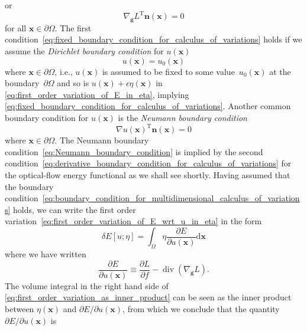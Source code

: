 \documentclass[12pt,a4paper]{article}
\begin{document}
or 
\begin{equation}
{\nabla_{\mathbf{g}} L}^{\operatorname{T}} \mathbf{n}(\mathbf{x}) = 0
\label{eq:derivative_boundary_condition_for_calculus_of_variations}
\end{equation}
for all $\mathbf{x} \in \partial\Omega$.
The first condition~\eqref{eq:fixed_boundary_condition_for_calculus_of_variations} holds
if we assume the \emph{Dirichlet boundary condition} for $u(\mathbf{x})$
\begin{equation}
u(\mathbf{x}) = u_0(\mathbf{x})
\label{eq:Dirichlet_boundary_condition}
\end{equation}
where $\mathbf{x} \in \partial\Omega$, i.e.,
$u(\mathbf{x})$ is assumed to be fixed to some value~$u_0(\mathbf{x})$
at the boundary~$\partial\Omega$ and
so is $u(\mathbf{x}) + \epsilon\eta(\mathbf{x})$ in
\eqref{eq:first_order_variation_of_E_in_eta},
implying \eqref{eq:fixed_boundary_condition_for_calculus_of_variations}.
Another common boundary condition for $u(\mathbf{x})$ is the \emph{Neumann boundary condition}
\begin{equation}
{\nabla u(\mathbf{x})}^{\operatorname{T}} \mathbf{n}(\mathbf{x}) = 0
\label{eq:Neumann_boundary_condition}
\end{equation}
where $\mathbf{x} \in \partial\Omega$.
The Neumann boundary condition~\eqref{eq:Neumann_boundary_condition} is implied by
the second condition~\eqref{eq:derivative_boundary_condition_for_calculus_of_variations}
for the optical-flow energy functional as we shall see shortly.
Having assumed that
the boundary condition~\eqref{eq:boundary_condition_for_multidimensional_calculus_of_variations}
holds, we can write the first order variation~\eqref{eq:first_order_variation_of_E_wrt_u_in_eta}
in the form
\begin{equation}
\delta E[u; \eta] = \int_{\Omega} \eta \frac{\partial E}{\partial u(\mathbf{x})}
\mathrm{d}\mathbf{x}
\label{eq:first_order_variation_as_inner_product}
\end{equation}
where we have written
\begin{equation}
\frac{\partial E}{\partial u(\mathbf{x})} \equiv
\frac{\partial L}{ \partial f} - \operatorname{div}\left( \nabla_{\mathbf{g}} L \right) .
\label{eq:multidimensional_functional_derivative}
\end{equation}
The volume integral in the right hand side of
\eqref{eq:first_order_variation_as_inner_product} can be seen as the inner product between
$\eta(\mathbf{x})$ and $\partial E/\partial u(\mathbf{x})$,
from which we conclude that the quantity~$\partial E/\partial u(\mathbf{x})$ is
\end{document}
